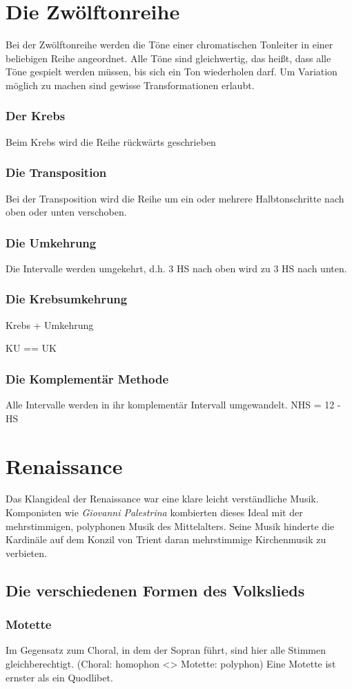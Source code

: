 \documentclass{article}
\begin{document}
\section*{Die Zwölftonreihe}
Bei der Zwölftonreihe werden die Töne einer chromatischen Tonleiter
in einer beliebigen Reihe angeordnet. Alle Töne sind gleichwertig,
das heißt, dass alle Töne gespielt werden müssen, bis sich ein Ton
wiederholen darf. Um Variation möglich zu machen sind gewisse
Transformationen erlaubt.
\subsubsection*{Der Krebs}
Beim Krebs wird die Reihe rückwärts geschrieben
\subsubsection*{Die Transposition}
Bei der Transposition wird die Reihe um ein oder mehrere
Halbtonschritte nach oben oder unten verschoben.
\subsubsection*{Die Umkehrung}
Die Intervalle werden umgekehrt, d.h. 3 HS nach oben wird zu
3 HS nach unten.
\subsubsection*{Die Krebsumkehrung}
Krebs + Umkehrung

KU == UK
\subsubsection*{Die Komplementär Methode}
Alle Intervalle werden in ihr komplementär Intervall umgewandelt.
NHS = 12 - HS

\section*{Renaissance}
Das Klangideal der Renaissance war eine klare leicht
verständliche Musik. Komponisten wie \emph{Giovanni Palestrina}
kombierten dieses Ideal mit der mehrstimmigen, polyphonen Musik des 
Mittelalters. Seine Musik hinderte die Kardinäle auf dem Konzil von Trient
daran mehrstimmige Kirchenmusik zu verbieten.
\subsection*{Die verschiedenen Formen des Volkslieds}
\subsubsection*{Motette}
Im Gegensatz zum Choral, in dem der Sopran führt, sind hier alle Stimmen
gleichberechtigt. (Choral: homophon <> Motette: polyphon) Eine Motette ist
ernster als ein Quodlibet.
\end{document}

